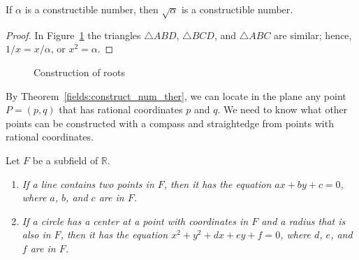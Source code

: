 \begin{lemma}
If $\alpha$ is a constructible number, then $\sqrt{\alpha}$ is a
constructible number.
\end{lemma}


\begin{proof}
In Figure~\ref{Root} the triangles $\triangle ABD$, $\triangle BCD$,
and $\triangle ABC$ are similar; hence, $1 /x = x / \alpha$, or $x^2 =
\alpha$. 
\end{proof}

\begin{figure}[htb]
\begin{center}
\end{center}
\caption{Construction of roots}
\label{Root}
\end{figure}



\medskip


By Theorem~\ref{fields:construct_num_ther}, we can locate in the plane any point $P =( p, q)$
that has rational coordinates $p$ and $q$. We need to know what other
points can be constructed with a compass and straightedge from points
with rational coordinates.  


\begin{lemma}
Let $F$ be a subfield of ${\mathbb R}$.
\begin{enumerate}

\rm \item \it
If a line contains two points in $F$, then it has the equation $a x + by
+ c = 0$, where $a$, $b$, and $c$ are in $F$.

\rm \item \it
If a circle has a center at a point with coordinates in $F$ and a radius
that is also in $F$, then it has the equation $x^2 + y^2 + d x + e y
+ f = 0$, where $d$, $e$, and $f$ are in $F$.

\end{enumerate}
\end{lemma}



